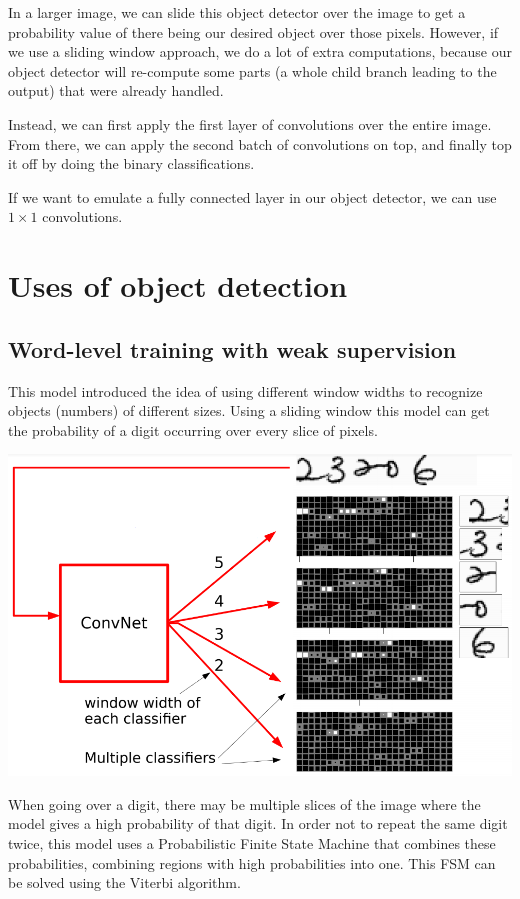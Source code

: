 In a larger image, we can slide this object detector over the image to get a probability value of there being our desired object over those pixels.
However, if we use a sliding window approach, we do a lot of extra computations, because our object detector will re-compute some parts (a whole child branch leading to the output) that were already handled.

Instead, we can first apply the first layer of convolutions over the entire image.
From there, we can apply the second batch of convolutions on top, and finally top it off by doing the binary classifications.

If we want to emulate a fully connected layer in our object detector, we can use $1\times1$ convolutions.

\section{Uses of object detection}

\subsection{Word-level training with weak supervision}
This model introduced the idea of using different window widths to recognize objects (numbers) of different sizes.
Using a sliding window this model can get the probability of a digit occurring over every slice of pixels.

\begin{center}
	\includegraphics[width=0.5\linewidth]{lectures/04-a/images/word-level.png}
\end{center}

When going over a digit, there may be multiple slices of the image where the model gives a high probability of that digit.
In order not to repeat the same digit twice, this model uses a Probabilistic Finite State Machine that combines these probabilities, combining regions with high probabilities into one.
This FSM can be solved using the Viterbi algorithm.

